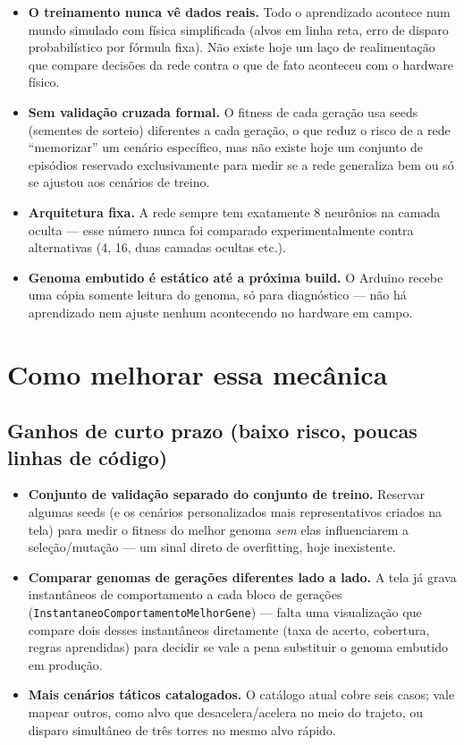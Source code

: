\documentclass[11pt,a4paper]{article}
\begin{document}
\begin{itemize}[leftmargin=1.4em]
  \item \textbf{O treinamento nunca vê dados reais.} Todo o aprendizado acontece num mundo
    simulado com física simplificada (alvos em linha reta, erro de disparo probabilístico por
    fórmula fixa). Não existe hoje um laço de realimentação que compare decisões da rede contra
    o que de fato aconteceu com o hardware físico.
  \item \textbf{Sem validação cruzada formal.} O fitness de cada geração usa seeds (sementes de
    sorteio) diferentes a cada geração, o que reduz o risco de a rede ``memorizar'' um cenário
    específico, mas não existe hoje um conjunto de episódios reservado exclusivamente para medir
    se a rede generaliza bem ou só se ajustou aos cenários de treino.
  \item \textbf{Arquitetura fixa.} A rede sempre tem exatamente 8 neurônios na camada oculta —
    esse número nunca foi comparado experimentalmente contra alternativas (4, 16, duas camadas
    ocultas etc.).
  \item \textbf{Genoma embutido é estático até a próxima build.} O Arduino recebe uma cópia
    somente leitura do genoma, só para diagnóstico — não há aprendizado nem ajuste nenhum
    acontecendo no hardware em campo.
\end{itemize}

\section{Como melhorar essa mecânica}

\subsection{Ganhos de curto prazo (baixo risco, poucas linhas de código)}

\begin{itemize}[leftmargin=1.4em]
  \item \textbf{Conjunto de validação separado do conjunto de treino.} Reservar algumas seeds (e
    os cenários personalizados mais representativos criados na tela) para medir o fitness do
    melhor genoma \emph{sem} elas influenciarem a seleção/mutação — um sinal direto de
    overfitting, hoje inexistente.
  \item \textbf{Comparar genomas de gerações diferentes lado a lado.} A tela já grava
    instantâneos de comportamento a cada bloco de gerações
    (\texttt{InstantaneoComportamentoMelhorGene}) — falta uma visualização que compare dois
    desses instantâneos diretamente (taxa de acerto, cobertura, regras aprendidas) para decidir
    se vale a pena substituir o genoma embutido em produção.
  \item \textbf{Mais cenários táticos catalogados.} O catálogo atual cobre seis casos; vale
    mapear outros, como alvo que desacelera/acelera no meio do trajeto, ou disparo simultâneo de
    três torres no mesmo alvo rápido.
\end{itemize}
\end{document}
